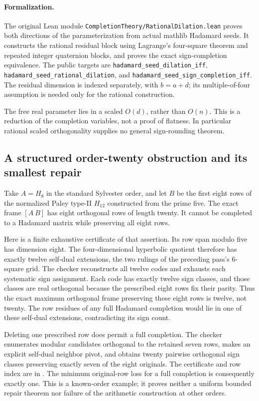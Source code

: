 \paragraph{Formalization.}
The original Lean module \texttt{CompletionTheory/RationalDilation.lean}
proves both directions of the parameterization from actual mathlib
Hadamard seeds. It constructs the rational residual block using
Lagrange's four-square theorem and repeated integer quaternion blocks,
and proves the exact sign-completion equivalence. The public targets are
\texttt{hadamard\_\allowbreak seed\_\allowbreak dilation\_\allowbreak iff},
\texttt{hadamard\_\allowbreak seed\_\allowbreak rational\_\allowbreak dilation},
and \texttt{hadamard\_\allowbreak seed\_\allowbreak sign\_\allowbreak completion\_\allowbreak iff}.
The residual dimension is indexed separately, with $b=a+d$; its
multiple-of-four assumption is needed only for the rational construction.

The free real parameter lies in a scaled $O(d)$, rather than $O(n)$.
This is a reduction of the completion variables, not a proof of
flatness. In particular rational scaled orthogonality supplies no
general sign-rounding theorem.

\subsection{A structured order-twenty obstruction and its smallest repair}
Take $A=H_8$ in the standard Sylvester order, and let $B$ be the
first eight rows of the normalized Paley type-II $H_{12}$ constructed
from the prime five. The exact frame $[A\ B]$ has eight orthogonal
rows of length twenty. It cannot be completed to a Hadamard matrix
while preserving all eight rows.

Here is a finite exhaustive certificate of that assertion.
Its row span modulo five has dimension eight. The four-dimensional
hyperbolic quotient therefore has exactly twelve self-dual
extensions, the two rulings of the preceding pass's $6$-square grid.
The checker reconstructs all twelve codes and exhausts each
systematic sign assignment. Each code has exactly twelve sign
classes, and those classes are real orthogonal because the
prescribed eight rows fix their parity. Thus the exact maximum
orthogonal frame preserving these eight rows is twelve, not twenty.
The row residues of any full Hadamard completion would lie in one
of these self-dual extensions, contradicting its sign count.

Deleting one prescribed row does permit a full completion.
The checker enumerates modular candidates orthogonal to the retained
seven rows, makes an explicit self-dual neighbor pivot, and obtains
twenty pairwise orthogonal sign classes preserving exactly seven of
the eight originals. The certificate and row index are in
. The minimum original-row loss for a
full completion is consequently exactly one.
This is a known-order example; it proves neither a uniform bounded
repair theorem nor failure of the arithmetic construction at other orders.

